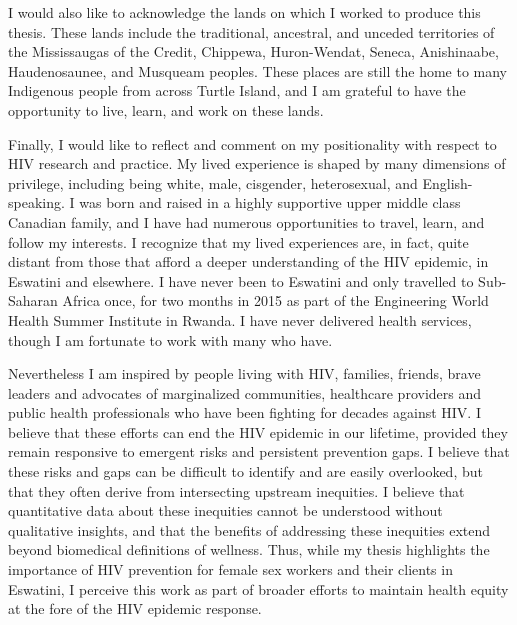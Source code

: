 \clearpage
I would also like to acknowledge the lands on which I worked to produce this thesis.
These lands include the traditional, ancestral, and unceded territories of the
Mississaugas of the Credit, Chippewa, Huron-Wendat, Seneca, %
Anishinaabe, Haudenosaunee, %
and Musqueam peoples. %
These places are still the home to many Indigenous people from across Turtle Island,
and I am grateful to have the opportunity to live, learn, and work on these lands.
\par
Finally, I would like to reflect and comment on my positionality with respect to HIV research and practice.
My lived experience is shaped by many dimensions of privilege, including being
white, male, cisgender, heterosexual, and English-speaking.
I was born and raised in a highly supportive upper middle class Canadian family,
and I have had numerous opportunities to travel, learn, and follow my interests.
I recognize that my lived experiences are, in fact, quite distant from those that
afford a deeper understanding of the HIV epidemic, in Eswatini and elsewhere.
I have never been to Eswatini and only travelled to Sub-Saharan Africa once,
for two months in 2015 as part of the Engineering World Health Summer Institute in Rwanda.
I have never delivered health services,
though I am fortunate to work with many who have.
\par
Nevertheless I am inspired by
people living with HIV, families, friends,
brave leaders and advocates of marginalized communities,
healthcare providers and public health professionals
who have been fighting for decades against HIV.
I believe that these efforts can end the HIV epidemic in our lifetime,
provided they remain responsive to emergent risks and persistent prevention gaps.
I believe that these risks and gaps can be difficult to identify and are easily overlooked,
but that they often derive from intersecting upstream inequities.
I believe that quantitative data about these inequities
cannot be understood without qualitative insights,
and that the benefits of addressing these inequities
extend beyond biomedical definitions of wellness.
Thus, while my thesis highlights the importance of
HIV prevention for female sex workers and their clients in Eswatini,
I perceive this work as part of broader efforts to
maintain health equity at the fore of the HIV epidemic response.
